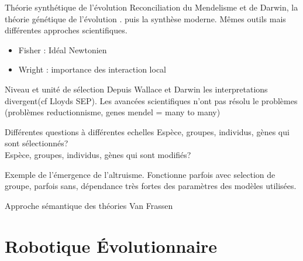 \documentclass[8pt]{beamer}
\begin{document}
\begin{frame}{Théorie synthétique de l'évolution}
	Reconciliation du Mendelisme et de Darwin, la théorie génétique de l'évolution \cite{fisher1930geneticaltheorynaturalselection}. puis la synthèse moderne.
\vfill 
	Mêmes outils mais différentes approches scientifiques.
	\begin{itemize}
		\item Fisher : Idéal Newtonien
		\item Wright : importance des interaction local
	\end{itemize}
	
\end{frame}
\begin{frame}{Niveau et unité de sélection}
	Depuis Wallace et Darwin les interpretations divergent(cf Lloyds SEP). Les avancées scientifiques n'ont pas résolu le problèmes (problèmes reductionnisme, genes mendel = many to many)  
	\vfill
	\begin{beamerboxesrounded}{Différentes questions à différentes echelles}
		Espèce, groupes, individus, gènes qui sont sélectionnés?\\
	        Espèce, groupes, individus, gènes qui sont modifiés?
	\end{beamerboxesrounded}
	\vfill
	Exemple de l'émergence de l'altruisme. Fonctionne parfois avec selection de groupe, parfois sans, dépendance très fortes des paramètres des modèles utilisées.



\end{frame}
\begin{frame}{Approche sémantique des théories}
	Van Frassen
\end{frame}
\section{Robotique \'Evolutionnaire}
\end{document}
